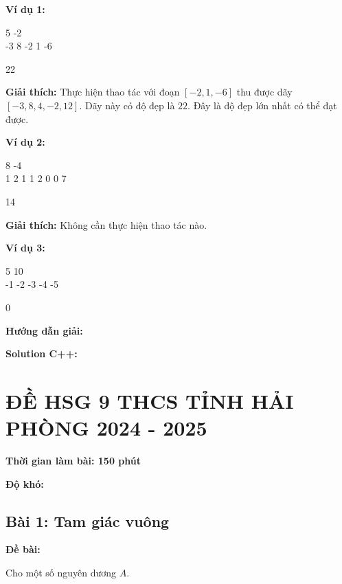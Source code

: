 \documentclass[12pt]{scrartcl}  %
\begin{document}
\textbf{Ví dụ 1:}
\begin{tcolorbox}[colback=gray!5!white, colframe=blue!50!black, title=Input]
5 -2\\
-3 8 -2 1 -6
\end{tcolorbox}
\begin{tcolorbox}[colback=gray!5!white, colframe=green!50!black, title=Output]
22
\end{tcolorbox}

\textbf{Giải thích:}
Thực hiện thao tác với đoạn $\left[ -2, 1, -6 \right]$ thu được dãy $\left[ -3, 8, 4, -2, 12 \right]$. Dãy này có độ đẹp là $22$. Đây là độ đẹp lớn nhất có thể đạt được.

\textbf{Ví dụ 2:}
\begin{tcolorbox}[colback=gray!5!white, colframe=blue!50!black, title=Input]
8 -4\\
1 2 1 1 2 0 0 7
\end{tcolorbox}
\begin{tcolorbox}[colback=gray!5!white, colframe=green!50!black, title=Output]
14
\end{tcolorbox}

\textbf{Giải thích:}
Không cần thực hiện thao tác nào.

\textbf{Ví dụ 3:}
\begin{tcolorbox}[colback=gray!5!white, colframe=blue!50!black, title=Input]
5 10\\
-1 -2 -3 -4 -5
\end{tcolorbox}
\begin{tcolorbox}[colback=gray!5!white, colframe=green!50!black, title=Output]
0
\end{tcolorbox}

\textbf{Hướng dẫn giải:}

\textbf{Solution C++:}

\section{ĐỀ HSG 9 THCS TỈNH HẢI PHÒNG 2024 - 2025}

\textbf{Thời gian làm bài: 150 phút}

\textbf{Độ khó: }

\subsection{Bài 1: Tam giác vuông}

\textbf{Đề bài:}

Cho một số nguyên dương $A$.
\end{document}
